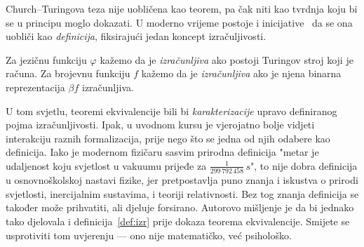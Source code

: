 Church--\!Turingova teza nije uobličena kao teorem, pa čak niti kao tvrdnja koju bi se u principu moglo dokazati. U moderno vrijeme postoje i inicijative~\cite{soare} da se ona uobliči kao \emph{definicija}, fiksirajući jedan koncept izračuljivosti.

\begin{definicija}[Soare]\label{def:izr}
Za jezičnu funkciju $\varphi$ kažemo da je \emph{izračunljiva} ako postoji Turingov stroj koji je računa.
Za brojevnu funkciju $f$ kažemo da je \emph{izračunljiva} ako je njena binarna reprezentacija $\beta f$ izračunljiva.
\end{definicija}

U tom svjetlu, teoremi ekvivalencije bili bi \emph{karakterizacije} upravo definiranog pojma izračunljivosti. Ipak, u uvodnom kursu je vjerojatno bolje vidjeti interakciju raznih formalizacija, prije nego što se jedna od njih odabere kao definicija. Iako je modernom fizičaru sasvim prirodna definicija "metar je udaljenost koju svjetlost u vakuumu prijeđe za $\frac{1}{299\,792\,458}\,s$", to nije dobra definicija u osnovnoškolskoj nastavi fizike, jer pretpostavlja puno znanja i iskustva o prirodi svjetlosti, inercijalnim sustavima, i teoriji relativnosti. Bez tog znanja definicija se također može prihvatiti, ali djeluje forsirano. Autorovo mišljenje je da bi jednako tako djelovala i definicija~\ref{def:izr} prije dokaza teorema ekvivalencije. Smijete se usprotiviti tom uvjerenju --- ono nije matematičko, već psihološko.

